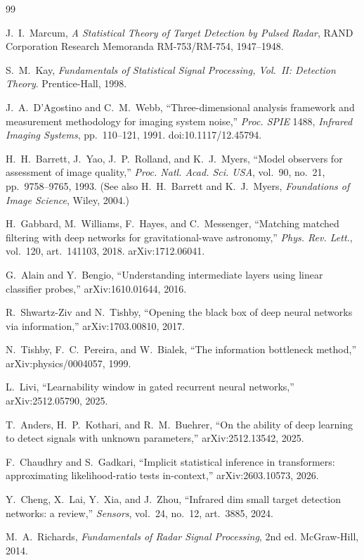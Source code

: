 \documentclass[11pt]{article}
\begin{document}
\begin{thebibliography}{99}

 J.~I.~Marcum, \emph{A Statistical Theory of Target Detection by
Pulsed Radar}, RAND Corporation Research Memoranda RM-753/RM-754, 1947--1948.

 S.~M.~Kay, \emph{Fundamentals of Statistical Signal Processing,
Vol.~II: Detection Theory}. Prentice-Hall, 1998.

 J.~A.~D'Agostino and C.~M.~Webb, ``Three-dimensional analysis
framework and measurement methodology for imaging system noise,'' \emph{Proc.
SPIE} 1488, \emph{Infrared Imaging Systems}, pp.~110--121, 1991.
doi:10.1117/12.45794.

 H.~H.~Barrett, J.~Yao, J.~P.~Rolland, and K.~J.~Myers, ``Model
observers for assessment of image quality,'' \emph{Proc. Natl. Acad. Sci. USA},
vol.~90, no.~21, pp.~9758--9765, 1993. (See also H.~H.~Barrett and K.~J.~Myers,
\emph{Foundations of Image Science}, Wiley, 2004.)

 H.~Gabbard, M.~Williams, F.~Hayes, and C.~Messenger, ``Matching
matched filtering with deep networks for gravitational-wave astronomy,''
\emph{Phys. Rev. Lett.}, vol.~120, art.~141103, 2018. arXiv:1712.06041.

 G.~Alain and Y.~Bengio, ``Understanding intermediate layers using
linear classifier probes,'' arXiv:1610.01644, 2016.

 R.~Shwartz-Ziv and N.~Tishby, ``Opening the black box of
deep neural networks via information,'' arXiv:1703.00810, 2017.

 N.~Tishby, F.~C.~Pereira, and W.~Bialek, ``The information bottleneck
method,'' arXiv:physics/0004057, 1999.

 L.~Livi, ``Learnability window in gated recurrent neural
networks,'' arXiv:2512.05790, 2025.

 T.~Anders, H.~P.~Kothari, and R.~M.~Buehrer, ``On the ability of
deep learning to detect signals with unknown parameters,'' arXiv:2512.13542,
2025.

 F.~Chaudhry and S.~Gadkari, ``Implicit statistical inference in
transformers: approximating likelihood-ratio tests in-context,''
arXiv:2603.10573, 2026.

 Y.~Cheng, X.~Lai, Y.~Xia, and J.~Zhou, ``Infrared dim small target
detection networks: a review,'' \emph{Sensors}, vol.~24, no.~12, art.~3885, 2024.

 M.~A.~Richards, \emph{Fundamentals of Radar Signal
Processing}, 2nd ed. McGraw-Hill, 2014.

\end{thebibliography}
\end{document}
